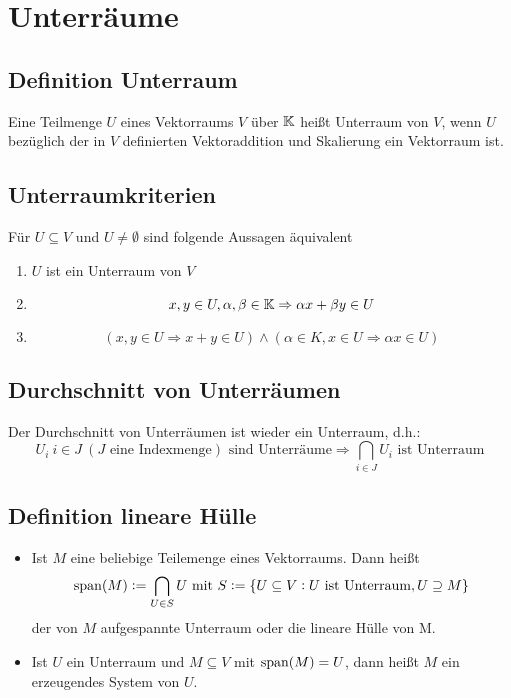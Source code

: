 \section{Unterräume}
\subsection{Definition Unterraum}
Eine Teilmenge $U$ eines Vektorraums $V$ über $\mathbb{K}$ heißt Unterraum von $V$, wenn
$U$ bezüglich der in $V$ definierten Vektoraddition und Skalierung ein Vektorraum
ist.

\subsection{Unterraumkriterien}
Für $U \subseteq V$ und $U \neq \emptyset$ sind folgende Aussagen äquivalent
\begin{enumerate}[label = (\alph*)]
    \item $U$ ist ein Unterraum von $V$
    \item
        \begin{equation*}
            x,y \in U, \alpha, \beta \in \mathbb{K} \Rightarrow
            \alpha x + \beta y \in U
        \end{equation*}
    \item
        \begin{equation*}
            (x,y \in U \Rightarrow x+y \in U) \land
            (\alpha \in K, x \in U \Rightarrow \alpha x \in U)
        \end{equation*}
\end{enumerate}

\subsection{Durchschnitt von Unterräumen}
Der Durchschnitt von Unterräumen ist wieder ein Unterraum, d.h.:
\begin{equation*}
    U_i\ i \in J\ (J\text{ eine Indexmenge}) \text{ sind Unterräume}
    \Rightarrow \bigcap_{i \in J} U_i \text{ ist Unterraum}
\end{equation*}

\subsection{Definition lineare Hülle}
\begin{itemize}
    \item Ist $M$ eine beliebige Teilemenge eines Vektorraums. Dann heißt
        \begin{equation*}
            \operatorname{span} (M) := \bigcap_{U \in S} U \text{ mit }
            S := \{ U \subseteq V: U \text{ ist Unterraum}, U \supseteq M \}
        \end{equation*}
        der von $M$ aufgespannte Unterraum oder die lineare Hülle von M.
    \item Ist $U$ ein Unterraum und $M \subseteq V$ mit $\operatorname{span}(M) = U$, dann heißt
        $M$ ein erzeugendes System von $U$.
\end{itemize}

